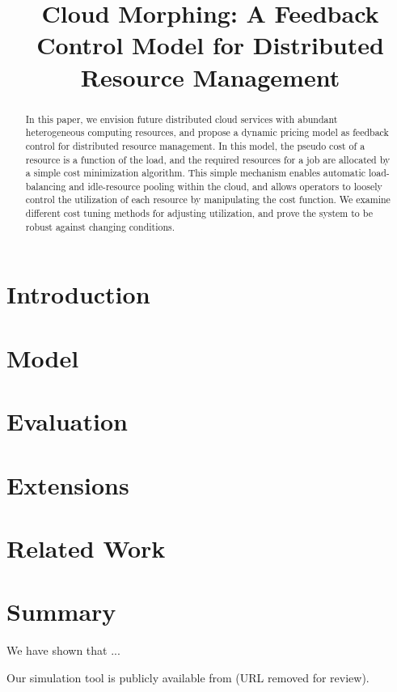 \documentclass[10pt,sigconf,letterpaper,anonymous,nonacm]{acmart}
\title{Cloud Morphing: A Feedback Control Model for Distributed Resource Management}
\begin{document}
\begin{abstract}

In this paper, we envision future distributed cloud services with
abundant heterogeneous computing resources,
and propose a dynamic pricing model as feedback control for
distributed resource management.
In this model, the pseudo cost of a resource is a function of the
load, and the required resources for a job are allocated by a simple
cost minimization algorithm.
This simple mechanism enables automatic load-balancing and
idle-resource pooling within the cloud, and allows operators to
loosely control the utilization of each resource by manipulating the
cost function. We examine different cost tuning methods for adjusting
utilization, and prove the system to be robust against changing
conditions. 

\end{abstract}

\maketitle

\section{Introduction}



\section{Model}



\section{Evaluation}



\section{Extensions}



\section{Related Work}



\section{Summary}

We have shown that ...

Our simulation tool is publicly available from (URL removed for review).



\end{document}
